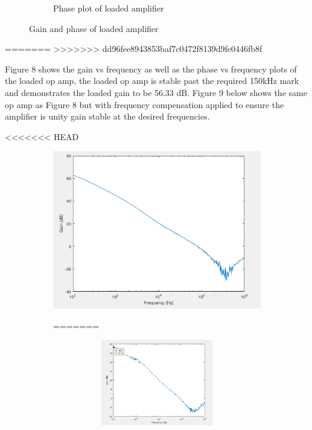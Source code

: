 \begin{figure}[H]
\begin{subfigure}[b]{0.45\textwidth}
				\caption{Phase plot of loaded amplifier}
				\label{fig:phasewithload}
			\end{subfigure}
			\caption{Gain and phase of loaded amplifier}
			\label{fig:loadamp}
		\end{figure} 
=======
>>>>>>> dd96fee8943853baf7c0472f8139d9fe0446fb8f
	
	Figure 8 shows the gain vs frequency as well as the phase vs frequency plots of the loaded op amp, the loaded op amp is stable past the required 150kHz mark and demonstrates the loaded gain to be 56.33 dB.
	\newpage
	Figure 9 below shows the same op amp as Figure 8 but with frequency compensation applied to ensure the amplifier is unity gain stable at the desired frequencies.
	
<<<<<<< HEAD
		\begin{figure}[H]
		\centering
		\begin{subfigure}[b]{0.45\textwidth}
			\centering
		\includegraphics[scale=.40]{ExperimentalImplementation/gainwithcomp.png}
		\caption{Gain plot of loaded amplifier and frequency compensation}
		\label{fig:gainwithcomp}
=======
	\begin{figure}[H]
		\centering
		\begin{subfigure}[b]{0.45\textwidth}
			\centering
			\includegraphics[scale=.40]{ExperimentalImplementation/gainwithload.png}

\end{subfigure}
\end{figure}
\end{subfigure}
\end{figure}
